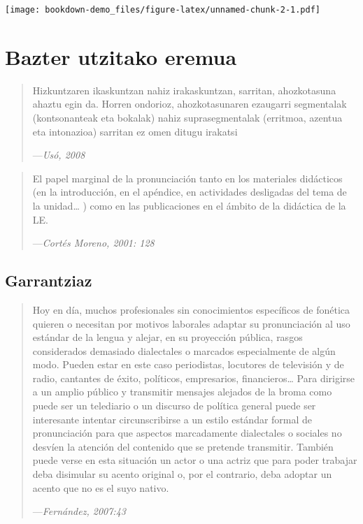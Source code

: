 \documentclass[]{book}
\begin{document}
\texttt{[image: bookdown-demo\_files/figure-latex/unnamed-chunk-2-1.pdf]}

\hypertarget{bazter-utzitako-eremua}{%
\section{Bazter utzitako eremua}\label{bazter-utzitako-eremua}}

\begin{quote}
Hizkuntzaren ikaskuntzan nahiz irakaskuntzan, sarritan, ahozkotasuna ahaztu
egin da. Horren ondorioz, ahozkotasunaren ezaugarri segmentalak
(kontsonanteak eta bokalak) nahiz suprasegmentalak (erritmoa, azentua eta
intonazioa) sarritan ez omen ditugu irakatsi

---\emph{Usó, 2008}
\end{quote}

\begin{quote}
El papel marginal de la pronunciación tanto en
los materiales didácticos (en la introducción, en
el apéndice, en actividades desligadas del tema
de la unidad\ldots{} ) como en las publicaciones en
el ámbito de la didáctica de la LE.

---\emph{Cortés Moreno, 2001: 128}
\end{quote}

\hypertarget{garrantziaz}{%
\subsection{Garrantziaz}\label{garrantziaz}}

\begin{quote}
Hoy en día, muchos profesionales sin conocimientos específicos de fonética
quieren o necesitan por motivos laborales adaptar su pronunciación al uso
estándar de la lengua y alejar, en su proyección pública, rasgos considerados
demasiado dialectales o marcados especialmente de algún modo. Pueden estar
en este caso periodistas, locutores de televisión y de radio, cantantes de éxito,
políticos, empresarios, financieros\ldots{} Para dirigirse a un amplio público y
transmitir mensajes alejados de la broma como puede ser un telediario o un
discurso de política general puede ser interesante intentar circunscribirse a un
estilo estándar formal de pronunciación para que aspectos marcadamente
dialectales o sociales no desvíen la atención del contenido que se pretende
transmitir. También puede verse en esta situación un actor o una actriz que para
poder trabajar deba disimular su acento original o, por el contrario, deba
adoptar un acento que no es el suyo nativo.

---\emph{Fernández, 2007:43}
\end{quote}
\end{document}
